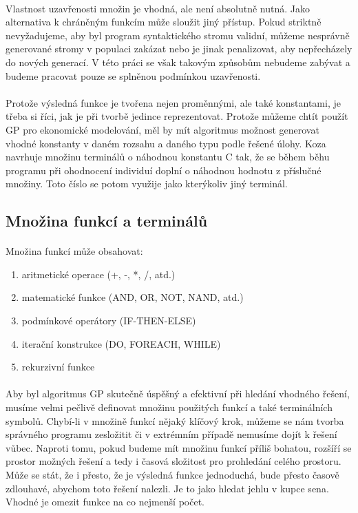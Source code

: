 \documentclass[bc,male,java,dept460]{diploma}		%
\begin{document}
\paragraph*{}
Vlastnost uzavřenosti množin je vhodná, ale není absolutně nutná. Jako alternativa k chráněným funkcím může sloužit jiný přístup. Pokud striktně nevyžadujeme, aby byl program syntaktického stromu validní, můžeme nesprávně generované stromy v populaci zakázat nebo je jinak penalizovat, aby nepřecházely do nových generací. V této práci se však takovým způsobům nebudeme zabývat a budeme pracovat pouze se splněnou podmínkou uzavřenosti.

\paragraph*{}
Protože výsledná funkce je tvořena nejen proměnnými, ale také konstantami, je třeba si říci, jak je při tvorbě jedince reprezentovat. Protože můžeme chtít použít GP pro ekonomické modelování, měl by mít algoritmus možnost generovat vhodné konstanty v daném rozsahu a daného typu podle řešené úlohy. Koza navrhuje množinu terminálů o náhodnou konstantu C tak, že se během běhu programu při ohodnocení individuí doplní o náhodnou hodnotu z příslučné množiny. Toto číslo se potom využije jako kterýkoliv jiný terminál.

\subsection{Množina funkcí a terminálů}
\paragraph*{}
Množina funkcí může obsahovat:
\begin{enumerate}
\item aritmetické operace (+, -, *, /, atd.)
\item matematické funkce (AND, OR, NOT, NAND, atd.)
\item podmínkové operátory (IF-THEN-ELSE)
\item iterační konstrukce (DO, FOREACH, WHILE)
\item rekurzivní funkce
\end{enumerate}

\paragraph*{}
Aby byl algoritmus GP skutečně úspěšný a efektivní při hledání vhodného řešení, musíme velmi pečlivě definovat množinu použitých funkcí a také terminálních symbolů. Chybí-li v množině funkcí nějaký klíčový krok, můžeme se nám tvorba správného programu zesložitit či v extrémním případě nemusíme dojít k řešení vůbec. Naproti tomu, pokud budeme mít množinu funkcí příliš bohatou, rozšíří se prostor možných řešení a tedy i časová složitost pro prohledání celého prostoru. Může se stát, že i přesto, že je výsledná funkce jednoduchá, bude přesto časově zdlouhavé, abychom toto řešení nalezli. Je to jako hledat jehlu v kupce sena. Vhodné je omezit funkce na co nejmenší počet.
\end{document}
